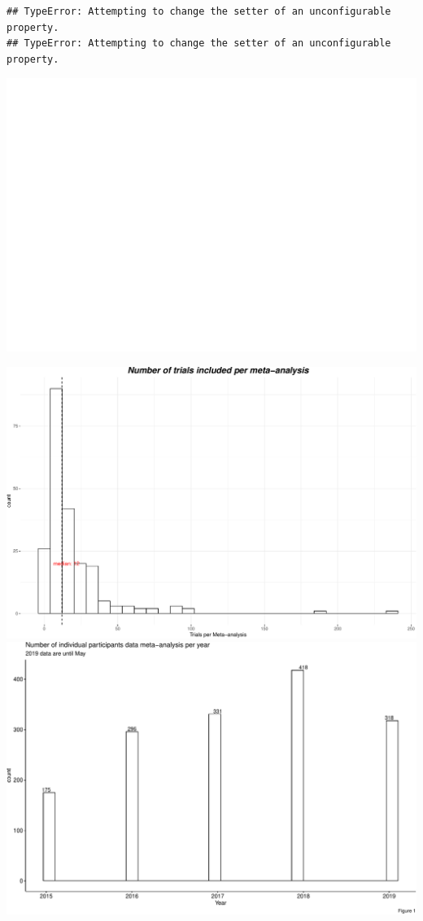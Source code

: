 \documentclass[]{article}
\begin{document}
\begin{verbatim}
## TypeError: Attempting to change the setter of an unconfigurable property.
## TypeError: Attempting to change the setter of an unconfigurable property.
\end{verbatim}

\includegraphics{Figs/unnamed-chunk-3-1.pdf}

\includegraphics{Figs/unnamed-chunk-4-1.pdf}
\includegraphics{Figs/unnamed-chunk-4-2.pdf}
\end{document}
